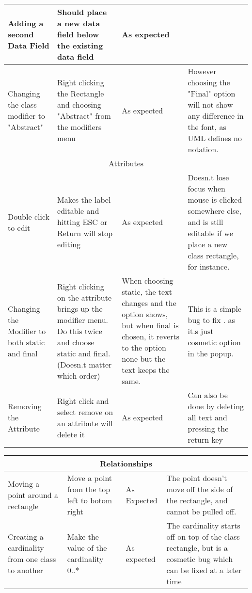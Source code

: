\begin{landscape}
\begin{tabular}{| p{3cm} | p{7cm} | p{7cm} | p{8cm} | }
	 Adding a second Data Field & Should place a new data field below the existing data field & As expected & \\ \hline

	 Changing the class modifier to "Abstract" & Right clicking the Rectangle and choosing "Abstract" from the modifiers menu & As expected & However choosing the "Final" option will not show any difference in the font, as UML defines no notation. \\ \hline

	\multicolumn{4}{|c|}{Attributes} \\ \hline
	Double click to edit &  Makes the label editable and hitting ESC or Return will stop editing & As expected & Doesn.t lose focus when mouse is clicked somewhere else, and is still editable if we place a new class rectangle, for instance. \\ \hline

	Changing the Modifier to both static and final & Right clicking on the attribute brings up the modifier menu. Do this twice and choose static and final. (Doesn.t matter which order) & When choosing static, the text changes and the option shows, but when final is chosen, it reverts to the option none but the text keeps the same. & This is a simple bug to fix . as it.s just cosmetic option in the popup. \\ \hline

	Removing the Attribute	& Right click and select remove on an attribute will delete it & As expected & Can also be done by deleting all text and pressing the return key \\ \hline
	
	
\end{tabular}
\newpage

\hspace{-19pt}
\begin{tabular}{| p{3cm} | p{7cm} | p{7cm} | p{8cm} |}
	\hline	
	\multicolumn{4}{|c|}{Relationships} \\ \hline

	Moving a point around a rectangle & Move a point from the top left to botom right & As Expected & The point doesn't move off the side of the rectangle, and cannot be pulled off. \\ \hline

	Creating a cardinality from one class to another & Make the value of the cardinality 0..* & As expected & The cardinality starts off on top of the class rectangle, but is a cosmetic bug which can be fixed at a later time \\ \hline


\end{tabular}
\end{landscape}
